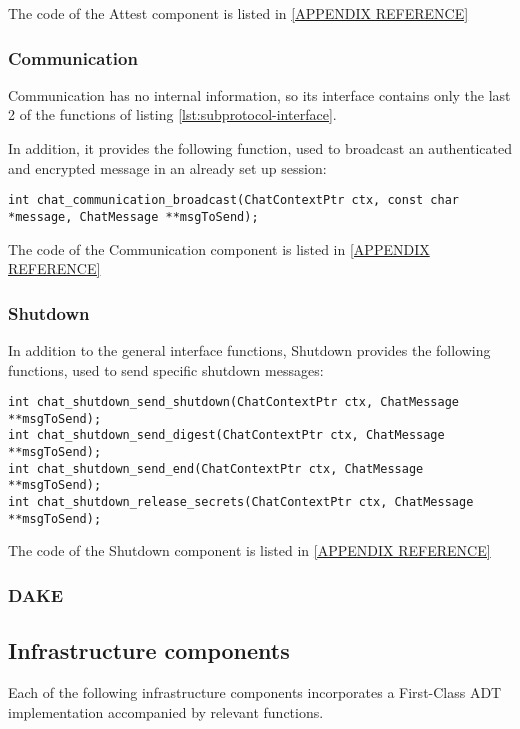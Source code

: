 The code of the Attest component is listed in \ref{APPENDIX REFERENCE}


\subsubsection{Communication}
Communication has no internal information, so its interface contains only the last 2 of the functions of listing \ref{lst:subprotocol-interface}.

In addition, it provides the following function, used to broadcast an authenticated and encrypted message in an already set up session:
\begin{lstlisting}[caption={Communication specific interface}]
int chat_communication_broadcast(ChatContextPtr ctx, const char *message, ChatMessage **msgToSend);
\end{lstlisting}

The code of the Communication component is listed in \ref{APPENDIX REFERENCE}

\subsubsection{Shutdown}
In addition to the general interface functions, Shutdown provides the following functions, used to send specific shutdown messages:
\begin{lstlisting}[caption={Shutdown specific interface}]
int chat_shutdown_send_shutdown(ChatContextPtr ctx, ChatMessage **msgToSend);
int chat_shutdown_send_digest(ChatContextPtr ctx, ChatMessage **msgToSend);
int chat_shutdown_send_end(ChatContextPtr ctx, ChatMessage **msgToSend);
int chat_shutdown_release_secrets(ChatContextPtr ctx, ChatMessage **msgToSend);
\end{lstlisting}

The code of the Shutdown component is listed in \ref{APPENDIX REFERENCE}

\subsubsection{DAKE}

\subsection{Infrastructure components}
Each of the following infrastructure components incorporates a First-Class ADT implementation accompanied by relevant functions.

